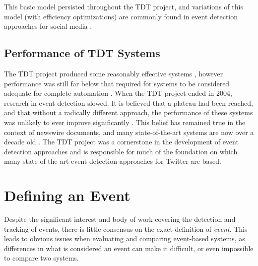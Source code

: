 This basic model persisted throughout the TDT project, and variations of this model (with efficiency optimizations) are commonly found in event detection approaches for social media \citep{becker2011beyond,Petrovic:2010:SFS:1857999.1858020,Aggarwal12,conf/asunam/OzdikisSO12}.

\subsection{Performance of TDT Systems}
The TDT project produced some reasonably effective systems \citep{UMASS,Yang98,Allan:2005:TTD:1042435.1042899}, however performance was still far below that required for systems to be considered adequate for complete automation \citep{Allan:2000:FSD:354756.354843}.
When the TDT project ended in 2004, research in event detection slowed. It is believed that a plateau had been reached, and that without a radically different approach, the performance of these systems was unlikely to ever improve significantly \citep{Allan:2000:FSD:354756.354843}. This belief has remained true in the context of newswire documents, and many state-of-the-art systems are now over a decade old \citep{UMASS,Yang98,Allan:2005:TTD:1042435.1042899}.
The TDT project was a cornerstone in the development of event detection approaches and is responsible for much of the foundation on which many state-of-the-art event detection approaches for Twitter are based.

\section{Defining an Event}
\label{background:event}
Despite the significant interest and body of work covering the detection and tracking of events, there is little consensus on the exact definition of \textit{event}.
This leads to obvious issues when evaluating and comparing event-based systems, as differences in what is considered an event can make it difficult, or even impossible to compare two systems.

